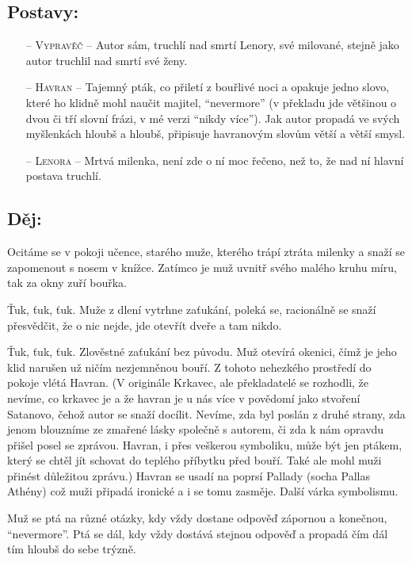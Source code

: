 \documentclass{extarticle} %
\begin{document}
\subsection*{Postavy:} 
\noindent
\begin{itemize}
    \item [--] \textsc{Vypravěč} -- Autor sám, truchlí nad smrtí Lenory, své milované, stejně jako autor truchlil nad smrtí své ženy. 
    \item [--] \textsc{Havran} -- Tajemný pták, co přiletí z bouřlivé noci a opakuje jedno slovo, které ho klidně mohl naučit majitel, \enquote{nevermore} (v překladu jde většinou o dvou či tří slovní frázi, v mé verzi \enquote{nikdy více}). Jak autor propadá ve svých myšlenkách hloubš a hloubš, připisuje havranovým slovům větší a větší smysl.
    \item [--] \textsc{Lenora} -- Mrtvá milenka, není zde o ní moc řečeno, než to, že nad ní hlavní postava truchlí.
\end{itemize}

\subsection*{Děj:}
{\setlength{\parindent}{0pt}\setlength{\parskip}{0.5em}
Ocitáme se v pokoji učence, starého muže, kterého trápí ztráta milenky a snaží se zapomenout s nosem v knížce. Zatímco je muž uvnitř svého malého kruhu míru, tak za okny zuří bouřka.

Ťuk, ťuk, ťuk. Muže z dlení vytrhne zaťukání, poleká se, racionálně se snaží přesvědčit, že o nic nejde, jde otevřít dveře a tam nikdo.

Ťuk, ťuk, ťuk. Zlověstné zaťukání bez původu. Muž otevírá okenici, čímž je jeho klid narušen už ničím nezjemněnou bouří. Z tohoto nehezkého prostředí do pokoje vlétá Havran. (V originále Krkavec, ale překladatelé se rozhodli, že nevíme, co krkavec je a že havran je u nás více v povědomí jako stvoření Satanovo, čehož autor se snaží docílit. Nevíme, zda byl poslán z druhé strany, zda jenom blouzníme ze zmařené lásky společně s autorem, či zda k nám opravdu přišel posel se zprávou. Havran, i přes veškerou symboliku, může být jen ptákem, který se chtěl jít schovat do teplého příbytku před bouří. Také ale mohl muži přinést důležitou zprávu.) Havran se usadí na poprsí Pallady (socha Pallas Athény) což muži připadá ironické a i se tomu zasměje. Další várka symbolismu.

Muž se ptá na různé otázky, kdy vždy dostane odpověď zápornou a konečnou, \enquote{nevermore}. Ptá se dál, kdy vždy dostává stejnou odpověď a propadá čím dál tím hloubš do sebe trýzně.
}
\end{document}
